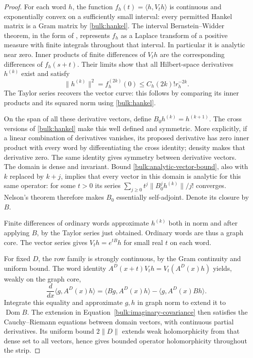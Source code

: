 \begin{proof}
For each word $h$, the function
$f_h(t)=\langle h,V_th\rangle$ is continuous and exponentially
convex on a sufficiently small interval: every permitted Hankel
matrix is a Gram matrix by \eqref{bulk:hankel}. The interval
Bernstein--Widder theorem, in the form of
\cite[Theorem 3.5 and Corollary 3.6]{BuescuPaixao2018}, represents
$f_h$ as a Laplace transform of a positive measure with finite
integrals throughout that interval. In particular it is analytic
near zero. Inner products of finite differences of $V_th$ are
the corresponding differences of $f_h(s+t)$. Their limits show
that all Hilbert-space derivatives $h^{(k)}$ exist and satisfy
\begin{equation}\label{bulk:analytic-vector-bound}
 \|h^{(k)}\|^2=f_h^{(2k)}(0)
 \le C_h(2k)!r_h^{-2k}.
\end{equation}
The Taylor series recovers the vector curve: this follows by
comparing its inner products and its squared norm using
\eqref{bulk:hankel}.

On the span of all these derivative vectors, define
$B_0h^{(k)}=h^{(k+1)}$. The cross versions of
\eqref{bulk:hankel} make this well defined and symmetric. More
explicitly, if a linear combination of derivatives vanishes, its
proposed derivative has zero inner product with every word by
differentiating the cross identity; density makes that derivative
zero. The same identity gives symmetry between derivative
vectors. The domain is dense and invariant. Bound
\eqref{bulk:analytic-vector-bound}, also with $k$ replaced by $k+j$,
implies that every vector in this domain is analytic for this same
operator: for some $t>0$ its series
$\sum_{j\ge0}t^j\|B_0^jh^{(k)}\|/j!$ converges. Nelson's theorem
\cite[Definition 4.7 and Theorem 4.8]{Neeb2011} therefore makes $B_0$
essentially self-adjoint. Denote its closure by $B$.

Finite differences of ordinary words approximate $h^{(k)}$ both
in norm and after applying $B$, by the Taylor series just obtained.
Ordinary words are thus a graph core. The vector series gives
$V_th=e^{tB}h$ for small real $t$ on each word.

For fixed $D$, the row family is strongly continuous, by the Gram
continuity and uniform bound. The word identity
$A^D(x+t)V_th=V_t(A^D(x)h)$ yields, weakly on the graph core,
\[
 \frac{d}{dx}\langle g,A^D(x)h\rangle
 =\langle Bg,A^D(x)h\rangle-\langle g,A^D(x)Bh\rangle.
\]
Integrate this equality and approximate $g,h$ in graph norm to
extend it to $\operatorname{Dom}B$. The extension in
Equation~\eqref{bulk:imaginary-covariance} then satisfies the Cauchy--Riemann
equations between domain vectors, with continuous partial
derivatives. Its uniform bound $2\|D\|$ extends weak holomorphicity
from that dense set to all vectors, hence gives bounded operator
holomorphicity throughout the strip.
\end{proof}

